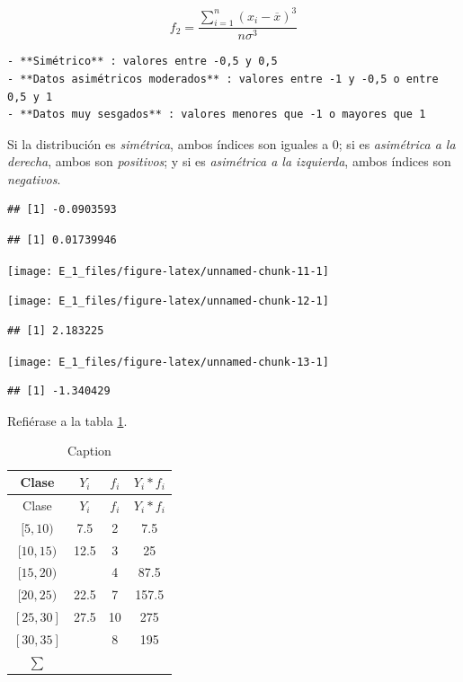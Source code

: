 \documentclass[10pt,]{krantz}
\theoremstyle{definition}
\theoremstyle{definition}
\theoremstyle{definition}
\theoremstyle{definition}
\theoremstyle{remark}
\begin{document}
\[f_2=\frac{\sum_{i=1}^{n}\left( x_i-\overline{x}\right)^3}{n\sigma^3}\]

\begin{verbatim}
- **Simétrico** : valores entre -0,5 y 0,5
- **Datos asimétricos moderados** : valores entre -1 y -0,5 o entre 0,5 y 1
- **Datos muy sesgados** : valores menores que -1 o mayores que 1
\end{verbatim}

Si la distribución es \emph{simétrica}, ambos índices son iguales a 0; si es \emph{asimétrica a la derecha}, ambos son \emph{positivos}; y si es \emph{asimétrica a la izquierda}, ambos índices son \emph{negativos}.

\begin{verbatim}
## [1] -0.0903593
\end{verbatim}

\begin{verbatim}
## [1] 0.01739946
\end{verbatim}

\begin{center}\texttt{[image: E\_1\_files/figure-latex/unnamed-chunk-11-1]} \end{center}

\begin{center}\texttt{[image: E\_1\_files/figure-latex/unnamed-chunk-12-1]} \end{center}

\begin{verbatim}
## [1] 2.183225
\end{verbatim}

\begin{center}\texttt{[image: E\_1\_files/figure-latex/unnamed-chunk-13-1]} \end{center}

\begin{verbatim}
## [1] -1.340429
\end{verbatim}

Refiérase a la tabla \ref{tab:w1}.

\begin{longtable}[]{@{}cccc@{}}
\caption{\label{tab:w1} Caption}\tabularnewline
\toprule
Clase & \(Y_i\) & \(f_i\) & \(Y_i*f_i\)\tabularnewline
\midrule
\endfirsthead
\toprule
Clase & \(Y_i\) & \(f_i\) & \(Y_i*f_i\)\tabularnewline
\midrule
\endhead
\([5,10)\) & 7.5 & 2 & 7.5\tabularnewline
\([10,15)\) & 12.5 & 3 & 25\tabularnewline
\([15,20)\) & & 4 & 87.5\tabularnewline
\([20,25)\) & 22.5 & 7 & 157.5\tabularnewline
\([25,30]\) & 27.5 & 10 & 275\tabularnewline
\([30,35]\) & & 8 & 195\tabularnewline
\(\sum\) & & &\tabularnewline
\bottomrule
\end{longtable}
\end{document}
